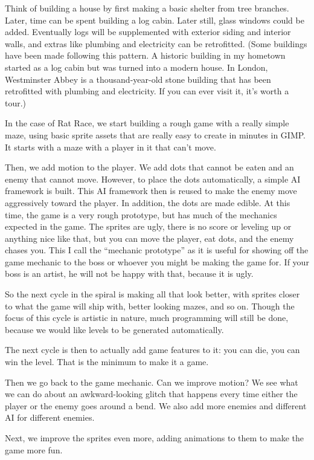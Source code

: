 \documentclass[12pt]{amsbook}
\theoremstyle{definition}
\theoremstyle{remark}
\numberwithin{figure}{chapter}
\numberwithin{table}{chapter}
\numberwithin{section}{chapter}
\numberwithin{equation}{section}
\begin{document}
Think of building a house by first making a basic shelter from tree branches.  Later, time can be spent building a log cabin.  Later still, glass windows could be added.  Eventually logs will be supplemented with exterior siding and interior walls, and extras like plumbing and electricity can be retrofitted.  (Some buildings have been made following this pattern.  A historic building in my hometown started as a log cabin but was turned into a modern house.  In London, Westminster Abbey is a thousand-year-old stone building that has been retrofitted with plumbing and electricity.  If you can ever visit it, it's worth a tour.)

In the case of Rat Race, we start building a rough game with a really simple maze, using basic sprite assets that are really easy to create in minutes in GIMP.   It starts with a maze with a player in it that can’t move.  

Then, we add motion to the player.  We add dots that cannot be eaten and an enemy that cannot move.  However, to place the dots automatically, a simple AI framework is built.  This AI framework then is reused to make the enemy move aggressively toward the player.  In addition, the dots are made edible.  At this time, the game is a very rough prototype, but has much of the mechanics expected in the game.  The sprites are ugly, there is no score or leveling up or anything nice like that, but you can move the player, eat dots, and the enemy chases you.  This I call the “mechanic prototype” as it is useful for showing off the game mechanic to the boss or whoever you might be making the game for.  If your boss is an artist, he will not be happy with that, because it is ugly.

So the next cycle in the spiral is making all that look better, with sprites closer to what the game will ship with, better looking mazes, and so on.  Though the focus of this cycle is artistic in nature, much programming will still be done, because we would like levels to be generated automatically.

The next cycle is then to actually add game features to it: you can die, you can win the level.  That is the minimum to make it a game.  

Then we go back to the game mechanic.  Can we improve motion? We see what we can do about an awkward-looking glitch that happens every time either the player or the enemy goes around a bend.  We also add more enemies and different AI for different enemies.

Next, we improve the sprites even more, adding animations to them to make the game more fun.
\end{document}
